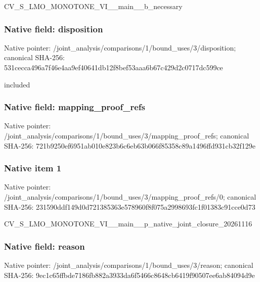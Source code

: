 \documentclass[10pt,a4paper]{article}
\begin{document}
\begingroup\raggedright\sloppy CV\_\allowbreak{}S\_\allowbreak{}LMO\_\allowbreak{}MONOTONE\_\allowbreak{}VI\_\allowbreak{}\_\allowbreak{}main\_\allowbreak{}\_\allowbreak{}b\_\allowbreak{}necessary\par\endgroup

\subsubsection{Native field: disposition}
Native pointer: /joint\_\allowbreak{}analysis/comparisons/1/bound\_\allowbreak{}uses/3/disposition; canonical SHA-256: 531cecca496a7f46e4aa9ef40641db12f8bef53aaa6b67c429d2c0717dc599ce

\begingroup\raggedright\sloppy included\par\endgroup

\subsubsection{Native field: mapping\_\allowbreak{}proof\_\allowbreak{}refs}
Native pointer: /joint\_\allowbreak{}analysis/comparisons/1/bound\_\allowbreak{}uses/3/mapping\_\allowbreak{}proof\_\allowbreak{}refs; canonical SHA-256: 721b9250ef6951ab010e823b6c6eb63b066f85358c89a1496ffd931cb32f129e

\subsubsection{Native item 1}
Native pointer: /joint\_\allowbreak{}analysis/comparisons/1/bound\_\allowbreak{}uses/3/mapping\_\allowbreak{}proof\_\allowbreak{}refs/0; canonical SHA-256: 231590ddf149d0d721385363e578960f8f075a2998693fc1f01383c91cce0d73

\begingroup\raggedright\sloppy CV\_\allowbreak{}S\_\allowbreak{}LMO\_\allowbreak{}MONOTONE\_\allowbreak{}VI\_\allowbreak{}\_\allowbreak{}main\_\allowbreak{}\_\allowbreak{}p\_\allowbreak{}native\_\allowbreak{}joint\_\allowbreak{}closure\_\allowbreak{}20261116\par\endgroup

\subsubsection{Native field: reason}
Native pointer: /joint\_\allowbreak{}analysis/comparisons/1/bound\_\allowbreak{}uses/3/reason; canonical SHA-256: 9ec1c65ffbde7186fb882a3933da6f5466c8648cb6419f90507ee6ab84094d9e
\end{document}
